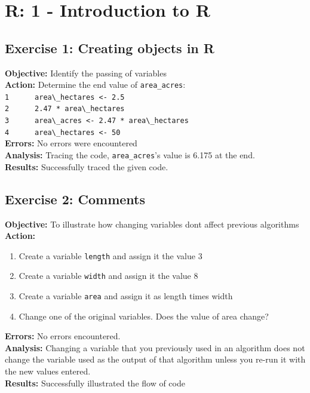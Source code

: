 \documentclass{article}
\begin{document}
\section{R: 1 - Introduction to R}
\subsection{Exercise 1: Creating objects in R}
\textbf{Objective:} Identify the passing of variables\\
\textbf{Action:} Determine the end value of \texttt{area\_acres}:\\
\verb|1      area\_hectares <- 2.5|\\
\verb|2      2.47 * area\_hectares|\\
\verb|3      area\_acres <- 2.47 * area\_hectares|\\
\verb|4      area\_hectares <- 50|\\
\textbf{Errors:} No errors were encountered\\
\textbf{Analysis:} Tracing the code, \texttt{area\_acres}'s value is 6.175 at the end.\\
\textbf{Results:} Successfully traced the given code.

\subsection{Exercise 2: Comments}
\textbf{Objective:} To illustrate how changing variables dont affect previous algorithms
\textbf{Action:}
\begin{enumerate}
    \item Create a variable \texttt{length} and assign it the value 3
    \item Create a variable \texttt{width} and assign it the value 8
    \item Create a variable \texttt{area} and assign it as length times width
    \item Change one of the original variables. Does the value of area change?
\end{enumerate}
\textbf{Errors:} No errors encountered.\\
\textbf{Analysis:} Changing a variable that you previously used in an algorithm does not change the variable used as the output of that algorithm unless you re-run it with the new values entered.\\
\textbf{Results:} Successfully illustrated the flow of code

\end{document}
